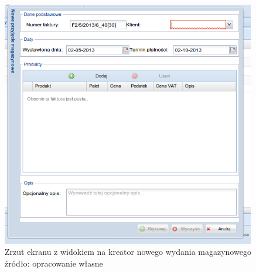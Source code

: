 		\begin{figure}[H]
			\centering
			\includegraphics[width=0.99\textwidth]{images/app/new_supply_preview}
			\caption[Aplikacja - Dodanie nowego dokumentu wydania]{
				Zrzut ekranu z widokiem na kreator nowego wydania magazynowego \\
				źródło: opracowanie własne
				}
			\label{c7:fig:app:new_supply_preview}
		\end{figure}
		
